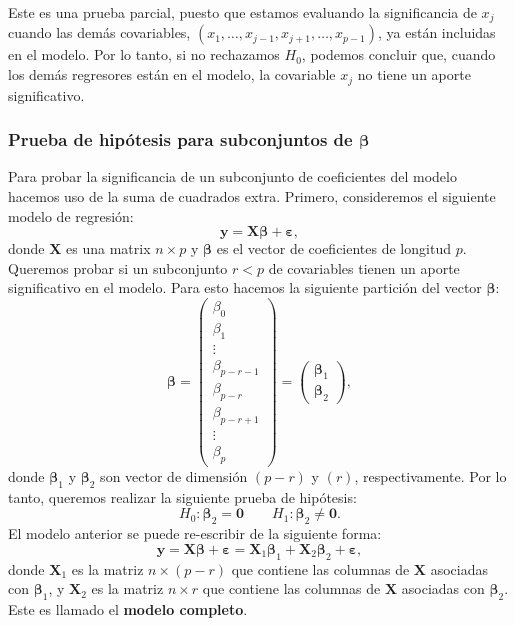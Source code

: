 \documentclass[
]{article}
\begin{document}
Este es una prueba parcial, puesto que estamos evaluando la significancia de \(x_{j}\) cuando las demás covariables, \((x_1,\ldots,x_{j-1},x_{j+1},\ldots,x_{p-1})\), ya están incluidas en el modelo. Por lo tanto, si no rechazamos \(H_{0}\), podemos concluir que, cuando los demás regresores están en el modelo, la covariable \(x_{j}\) no tiene un aporte significativo.

\subsubsection{\texorpdfstring{Prueba de hipótesis para subconjuntos de \(\boldsymbol \beta\)}{Prueba de hipótesis para subconjuntos de \textbackslash boldsymbol \textbackslash beta}}\label{prueba-de-hipuxf3tesis-para-subconjuntos-de-boldsymbol-beta}

Para probar la significancia de un subconjunto de coeficientes del modelo hacemos uso de la suma de cuadrados extra. Primero, consideremos el siguiente modelo de regresión:
\[
\boldsymbol y= \boldsymbol X\boldsymbol \beta+ \boldsymbol \varepsilon,
\]
donde \(\boldsymbol X\) es una matrix \(n \times p\) y \(\boldsymbol \beta\) es el vector de coeficientes de longitud \(p\). Queremos probar si un subconjunto \(r < p\) de covariables tienen un aporte significativo en el modelo. Para esto hacemos la siguiente partición del vector \(\boldsymbol \beta\):
\[
\boldsymbol \beta= \begin{pmatrix} \beta_{0} \\ \beta_{1} \\ \vdots \\ \beta_{p-r-1} \\ \hline \beta_{p-r} \\ \beta_{p-r+1} \\ \vdots \\  \beta_{p} \end{pmatrix} =  \begin{pmatrix} \boldsymbol \beta_{1} \\ \hline \boldsymbol \beta_{2}\end{pmatrix},
\]
donde \(\boldsymbol \beta_{1}\) y \(\boldsymbol \beta_{2}\) son vector de dimensión \((p-r)\) y \((r)\), respectivamente. Por lo tanto, queremos realizar la siguiente prueba de hipótesis:
\begin{equation}
H_{0}:  \boldsymbol \beta_{2} = \boldsymbol 0\qquad H_{1}:  \boldsymbol \beta_{2} \neq \boldsymbol 0.
\label{eq:Hsubset}
\end{equation}
El modelo anterior se puede re-escribir de la siguiente forma:
\[
\boldsymbol y= \boldsymbol X\boldsymbol \beta+ \boldsymbol \varepsilon= \boldsymbol X_{1}\boldsymbol \beta_{1}+ \boldsymbol X_{2}\boldsymbol \beta_{2} + \boldsymbol \varepsilon,
\]
donde \(\boldsymbol X_{1}\) es la matriz \(n\times (p-r)\) que contiene las columnas de \(\boldsymbol X\) asociadas con \(\boldsymbol \beta_{1}\), y \(\boldsymbol X_{2}\) es la matriz \(n\times r\) que contiene las columnas de \(\boldsymbol X\) asociadas con \(\boldsymbol \beta_{2}\). Este es llamado el \textbf{modelo completo}.
\end{document}
